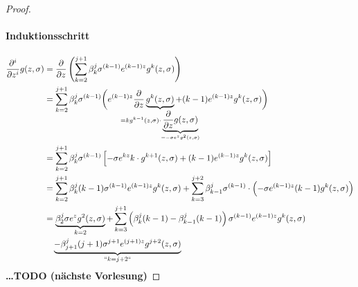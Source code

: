 \begin{lemma}
\begin{proof}
		\paragraph*{Induktionsschritt}
		\begin{align*}
			\frac{\partial^i}{\partial z^i} g(z,\sigma) &= \frac{\partial}{\partial z} \left( \sum_{k=2}^{j+1} \beta_k^j \sigma^{(k-1)} e^{(k-1)z} g^k(z,\sigma) \right)\\
			&= \sum_{k=2}^{j+1} \beta_k^j \sigma^{(k-1)} \bigg( e^{(k-1)z} \frac{\partial}{\partial z} \underbrace{g^k(z,\sigma)}_{\mathclap{= kg^{k-1}(z,\sigma) \cdot \underbrace{\frac{\partial}{\partial z} g(z,\sigma)}_{=-\sigma e^z g^2(z,\sigma)}}}+(k-1)e^{(k-1)z} g^k(z,\sigma) \bigg)\\
			&= \sum_{k=2}^{j+1} \beta_k^j \sigma^{(k-1)} \left[ -\sigma e^{kz} k \cdot g^{k+1}(z,\sigma) + (k-1) e^{(k-1)z} g^k(z,\sigma) \right]\\
			&= \sum_{k=2}^{j+1} \beta_k^j (k-1) \sigma^{(k-1)} e^{(k-1)z} g^k(z,\sigma) + \sum_{k=3}^{j+2} \beta_{k-1}^j \sigma^{(k-1)} \cdot \left( -\sigma e^{(k-1)z} (k-1) g^k(z,\sigma) \right)\\
			&= \underbrace{\beta_2^j \sigma e^z g^2(z,\sigma)}_{k = 2} + \sum_{k=3}^{j+1} \left( \beta_k^j(k-1) - \beta_{k-1}^j(k-1) \right) \sigma^{(k-1)} e^{(k-1)z} g^k(z,\sigma)\\
			&\quad \underbrace{- \beta_{j+1}^j (j+1) \sigma^{j+1} e^{(j+1)z} g^{j+2}(z,\sigma)}_{``k=j+2``}
		\end{align*}
		{\bf \ldots TODO (nächste Vorlesung)}
	\end{proof}
\end{lemma}
